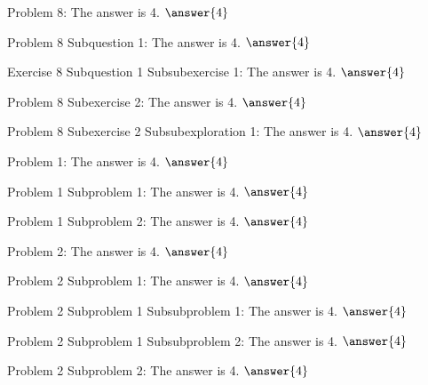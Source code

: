 \documentclass{ximera}
\begin{document}
\begin{problem}\label{problem:8}
    Problem 8: The answer is 4. $\answer{4}$
    \begin{question}
        Problem 8 Subquestion 1: The answer is 4. $\answer{4}$
        \begin{exercise}
            Exercise 8 Subquestion 1 Subsubexercise 1: The answer is 4. $\answer{4}$
        \end{exercise}
    \end{question}
    \begin{exercise}
        Problem 8 Subexercise 2: The answer is 4. $\answer{4}$
        \begin{exploration}
            Problem 8 Subexercise 2 Subsubexploration 1: The answer is 4. $\answer{4}$
        \end{exploration}
    \end{exercise}
\end{problem}
\begin{problem}
    \begin{problem}\label{problem:1}
        Problem 1: The answer is 4. $\answer{4}$ 
        \begin{problem}\label{problem:1.1}
            Problem 1 Subproblem 1: The answer is 4. $\answer{4}$ 
        \end{problem} 
        \begin{problem}\label{problem:1.2}
            Problem 1 Subproblem 2: The answer is 4. $\answer{4}$ 
        \end{problem} 
    \end{problem} 
\end{problem} 

\begin{problem}
    Problem 2: The answer is 4. $\answer{4}$
    \begin{problem}
        Problem 2 Subproblem 1: The answer is 4. $\answer{4}$
        \begin{problem}
            Problem 2 Subproblem 1 Subsubproblem 1: The answer is 4. $\answer{4}$
        \end{problem} 
        \begin{problem}
            Problem 2 Subproblem 1 Subsubproblem 2: The answer is 4. $\answer{4}$
        \end{problem} 
    \end{problem} 
    \begin{problem}
        Problem 2 Subproblem 2: The answer is 4. $\answer{4}$
    \end{problem} 
\end{problem} 
\end{document}
